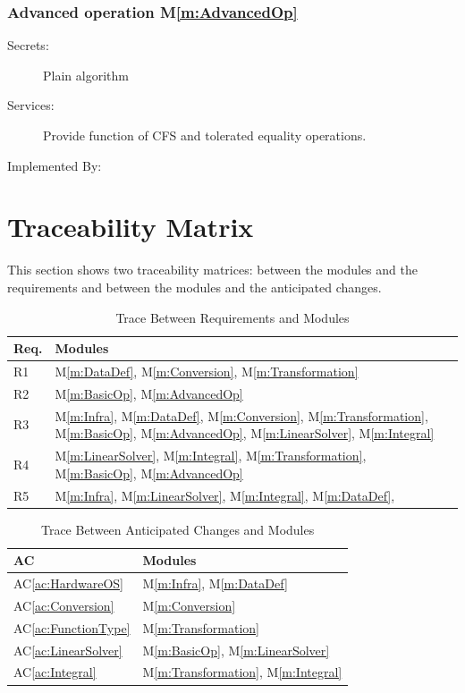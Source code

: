 \documentclass[12pt, titlepage]{article}
\newcommand{\acref}[1]{AC\ref{ac:#1}}
\newcommand{\mref}[1]{M\ref{m:#1}}
\begin{document}
\subsubsection{Advanced operation \mref{AdvancedOp}}
\begin{description}
	\item[Secrets:] Plain algorithm 
	\item[Services:] Provide function of CFS and tolerated equality operations.
	\item[Implemented By:] \progname
\end{description}

\section{Traceability Matrix} \label{SecTM}

This section shows two traceability matrices: between the modules and the
requirements and between the modules and the anticipated changes.

\begin{table}[H]
\centering
\begin{tabular}{p{} p{}}
\toprule
\textbf{Req.} & \textbf{Modules}\\
\midrule
R1 & \mref{DataDef}, \mref{Conversion}, \mref{Transformation}\\
R2 & \mref{BasicOp}, \mref{AdvancedOp}\\
R3 & \mref{Infra}, \mref{DataDef}, \mref{Conversion}, \mref{Transformation}, \mref{BasicOp}, \mref{AdvancedOp}, \mref{LinearSolver}, \mref{Integral}\\
R4 & \mref{LinearSolver}, \mref{Integral}, \mref{Transformation}, \mref{BasicOp}, \mref{AdvancedOp}\\
R5 & \mref{Infra},  \mref{LinearSolver}, \mref{Integral}, \mref{DataDef},\\
\bottomrule
\end{tabular}
\caption{Trace Between Requirements and Modules}
\label{TblRT}
\end{table}

\begin{table}[H]
\centering
\begin{tabular}{p{} p{}}
\toprule
\textbf{AC} & \textbf{Modules}\\
\midrule
\acref{HardwareOS} & \mref{Infra}, \mref{DataDef}\\ 
\acref{Conversion} & \mref{Conversion}\\ 
\acref{FunctionType}& \mref{Transformation}\\ 
\acref{LinearSolver} & \mref{BasicOp}, \mref{LinearSolver}\\ 
\acref{Integral} & \mref{Transformation}, \mref{Integral}\\ 
\bottomrule
\end{tabular}
\caption{Trace Between Anticipated Changes and Modules}
\label{TblACT}
\end{table}
\end{document}
